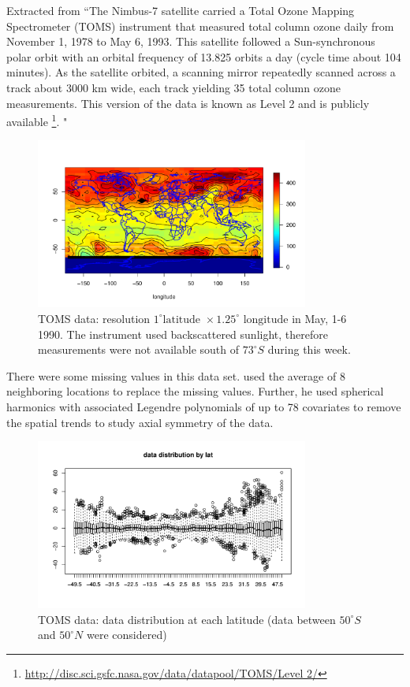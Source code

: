 Extracted from \cite{Stein2007} ``The Nimbus-7 satellite carried a Total Ozone Mapping Spectrometer (TOMS) instrument that measured total column ozone daily from November 1, 1978 to May 6, 1993. This satellite followed a Sun-synchronous polar orbit with an orbital frequency of 13.825 orbits a day (cycle time about 104 minutes). As the satellite orbited, a scanning mirror repeatedly scanned across a track about 3000 km wide, each track yielding 35 total column ozone measurements. This version of the data is known as Level 2 and is publicly available \footnote{\url{http://disc.sci.gsfc.nasa.gov/data/datapool/TOMS/Level 2/}}. "

\begin{figure}[H]
\label{TOMS_data}
\centering
\includegraphics [width=0.8\textwidth, keepaspectratio]{graphs/TOMS_data.pdf}
\caption{TOMS data: resolution $1^\circ \mbox{latitude } \times 1.25^\circ \mbox{ longitude}$ in May, 1-6 1990. The instrument used backscattered sunlight, therefore measurements were not available south of $73^\circ S$ during this week.}
\end{figure}

There were some missing values in this data set. \cite{Stein2007} used the average of 8 neighboring locations to replace the missing values. Further, he used spherical harmonics with associated Legendre polynomials of up to 78 covariates to remove the spatial trends to study axial symmetry of the data.
\begin{figure}[H]
\centering
\includegraphics [width=0.8\textwidth, keepaspectratio]{graphs/TOMS_data_latitude.pdf}
\caption{TOMS data: data distribution at each latitude (data between $50^\circ S$ and $50^\circ N$ were considered)}
\label{TOMS_data_latitude}
\end{figure}

